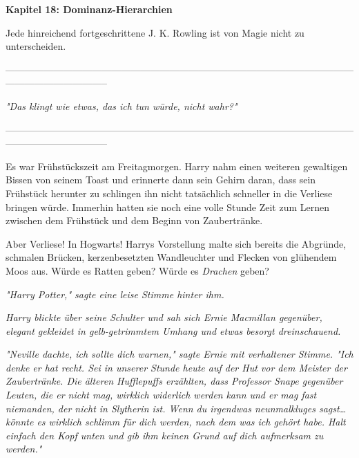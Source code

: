 

\hypertarget{dominanz-hierarchien}{%

\textbf{Kapitel 18: Dominanz-Hierarchien\\ }

Jede hinreichend fortgeschrittene J. K. Rowling ist von Magie nicht zu unterscheiden.

--------------------------------------------------------------------------------------------------------------------------------------------

\emph{"Das klingt wie etwas, das ich tun würde, nicht wahr?"}

--------------------------------------------------------------------------------------------------------------------------------------------

Es war Frühstückszeit am Freitagmorgen. Harry nahm einen weiteren gewaltigen Bissen von seinem Toast und erinnerte dann sein Gehirn daran, dass sein Frühstück herunter zu schlingen ihn nicht tatsächlich schneller in die Verliese bringen würde. Immerhin hatten sie noch eine volle Stunde Zeit zum Lernen zwischen dem Frühstück und dem Beginn von Zaubertränke.

Aber Verliese! In Hogwarts! Harrys Vorstellung malte sich bereits die Abgründe, schmalen Brücken, kerzenbesetzten Wandleuchter und Flecken von glühendem Moos aus. Würde es Ratten geben? Würde es \emph{Drachen} geben?

\emph{"Harry Potter," sagte eine leise Stimme hinter ihm.}

\emph{Harry blickte über seine Schulter und sah sich Ernie Macmillan gegenüber, elegant gekleidet in gelb-getrimmtem Umhang und etwas besorgt dreinschauend.}

\emph{"Neville dachte, ich sollte dich warnen," sagte Ernie mit verhaltener Stimme. "Ich denke er hat recht. Sei in unserer Stunde heute auf der Hut vor dem Meister der Zaubertränke. Die älteren Hufflepuffs erzählten, dass Professor Snape gegenüber Leuten, die er nicht mag, wirklich widerlich werden} \emph{kann} \emph{und er mag fast niemanden, der nicht in Slytherin ist. Wenn du irgendwas neunmalkluges sagst… könnte es wirklich schlimm für dich werden, nach dem was ich gehört habe. Halt einfach den Kopf unten und gib ihm keinen Grund auf dich aufmerksam zu werden."}

}
